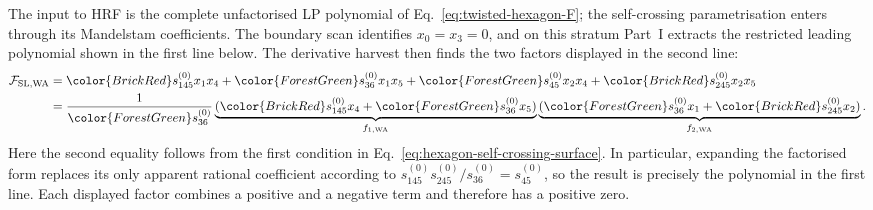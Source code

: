 \documentclass[a4paper,11pt]{article}
\newcommand{\PosInv}[1]{{\color{ForestGreen}#1}}
\newcommand{\NegInv}[1]{{\color{BrickRed}#1}}
\begin{document}
The input to HRF is the complete unfactorised LP polynomial of
Eq.~\eqref{eq:twisted-hexagon-F}; the self-crossing parametrisation enters
through its Mandelstam coefficients.  The boundary scan identifies
\(x_0=x_3=0\), and on this stratum Part~I extracts the restricted leading
polynomial shown in the first line below.  The derivative harvest then finds
the two factors displayed in the second line:
\begin{align}
 \mathcal F_{\mathrm{SL,WA}}
 &=\NegInv{s_{145}^{(0)}}x_1x_4+\PosInv{s_{36}^{(0)}}x_1x_5
 +\PosInv{s_{45}^{(0)}}x_2x_4+\NegInv{s_{245}^{(0)}}x_2x_5
 \nonumber\\
 &=\frac{1}{\PosInv{s_{36}^{(0)}}}
 \underbrace{(\NegInv{s_{145}^{(0)}}x_4+\PosInv{s_{36}^{(0)}}x_5)}_{f_{1,\mathrm{WA}}}
 \underbrace{(\PosInv{s_{36}^{(0)}}x_1+\NegInv{s_{245}^{(0)}}x_2)}_{f_{2,\mathrm{WA}}}.
 \label{eq:hexagon-wide-angle-boundary-factorisation}
\end{align}
Here the second equality follows from the first condition in
Eq.~\eqref{eq:hexagon-self-crossing-surface}.  In particular, expanding the
factorised form replaces its only apparent rational coefficient according to
\(s_{145}^{(0)}s_{245}^{(0)}/s_{36}^{(0)}=s_{45}^{(0)}\), so the result is precisely the polynomial
in the first line.  Each displayed factor combines a positive and a negative
term and therefore has a positive zero.
\end{document}
